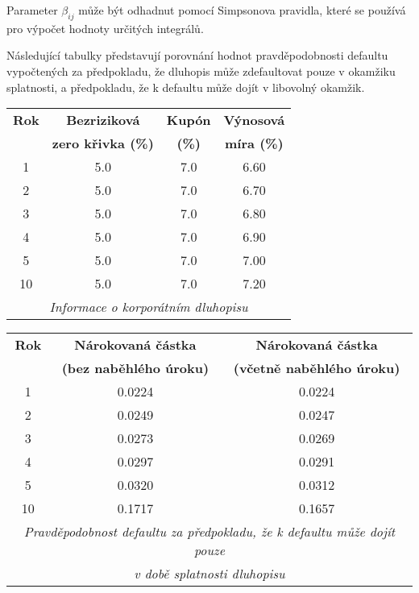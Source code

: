 \documentclass[a4paper]{book}
\begin{document}
Parameter $\beta_{ij}$ může být odhadnut pomocí Simpsonova pravidla, které se používá pro výpočet hodnoty určitých integrálů. 

Následující tabulky představují porovnání hodnot pravděpodobnosti defaultu vypočtených za předpokladu, že dluhopis může zdefaultovat pouze v okamžiku splatnosti, a předpokladu, že k defaultu může dojít v libovolný okamžik.

\begin{center}
\begin{tabular}{c c c c}
\textbf{Rok} &
\textbf{Bezriziková} &
\textbf{Kupón} &
\textbf{Výnosová}\\
\textbf{} &
\textbf{zero křivka (\%)} &
\textbf{(\%)} &
\textbf{míra (\%)}\\
\hline
1  & 5.0 & 7.0 & 6.60\\
2  & 5.0 & 7.0 & 6.70\\
3  & 5.0 & 7.0 & 6.80\\
4  & 5.0 & 7.0 & 6.90\\
5  & 5.0 & 7.0 & 7.00\\
10 & 5.0 & 7.0 & 7.20\\
\hline
\multicolumn{4}{c}{\footnotesize{\textit{Informace o korporátním dluhopisu}}}\\
\end{tabular}
\end{center}

\begin{center}
\begin{tabular}{c c c}
\textbf{Rok} &
\textbf{Nárokovaná částka} &
\textbf{Nárokovaná částka}\\
\textbf{} &
\textbf{(bez naběhlého úroku)} &
\textbf{(včetně naběhlého úroku)}\\
\hline
1  & 0.0224 & 0.0224\\
2  & 0.0249 & 0.0247\\
3  & 0.0273 & 0.0269\\
4  & 0.0297 & 0.0291\\
5  & 0.0320 & 0.0312\\
10 & 0.1717 & 0.1657\\
\hline
\multicolumn{3}{c}{\footnotesize{\textit{Pravděpodobnost defaultu za předpokladu, že k defaultu může dojít pouze}}} \\
\multicolumn{3}{c}{\footnotesize{\textit{v době splatnosti dluhopisu}}} \\
\end{tabular}
\end{center}
\end{document}
